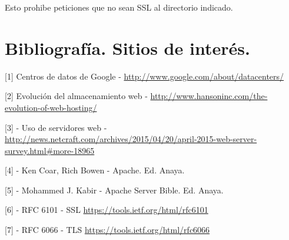 \documentclass[a4paper, 10pt]{article} %
\begin{document}
Esto prohibe peticiones que no sean SSL al directorio indicado. 

\pagebreak

\section{Bibliografía. Sitios de interés.}

[1] Centros de datos de Google - \url{http://www.google.com/about/datacenters/}

[2] Evolución del almacenamiento web - \url{http://www.hansoninc.com/the-evolution-of-web-hosting/}

[3] - Uso de servidores web - \url{http://news.netcraft.com/archives/2015/04/20/april-2015-web-server-survey.html\#more-18965}

[4] - Ken Coar, Rich Bowen - Apache. Ed. Anaya. 

[5] - Mohammed J. Kabir - Apache Server Bible. Ed. Anaya. 

[6] - RFC 6101 - SSL \url{https://tools.ietf.org/html/rfc6101}

[7] - RFC 6066 - TLS \url{https://tools.ietf.org/html/rfc6066}

%
\end{document}
